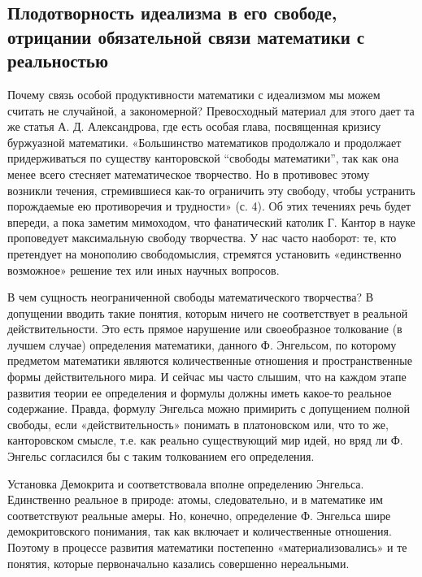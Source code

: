 \subsection{Плодотворность   идеализма   в  его   свободе,   отрицании
обязательной связи математики с реальностью}

Почему связь  особой продуктивности  математики с идеализмом  мы можем
считать  не  случайной,  а  закономерной?  Превосходный  материал  для
этого  дает  та  же  статья   А.  Д.  Александрова,  где  есть  особая
глава,   посвященная  кризису   буржуазной  математики.   «Большинство
математиков  продолжало   и  продолжает  придерживаться   по  существу
канторовской  ``свободы   математики'',  так   как  она   менее  всего
стесняет  математическое творчество.  Но в  противовес этому  возникли
течения, стремившиеся  как-то ограничить эту свободу,  чтобы устранить
порождаемые ею противоречия и трудности» (с. 4). Об этих течениях речь
будет  впереди, а  пока  заметим мимоходом,  что фанатический  католик
Г.  Кантор  в науке  проповедует  максимальную  свободу творчества.  У
нас  часто наоборот:  те, кто  претендует на  монополию свободомыслия,
стремятся  установить «единственно  возможное»  решение  тех или  иных
научных вопросов.

В чем  сущность неограниченной  свободы математического  творчества? В
допущении  вводить такие  понятия, которым  ничего не  соответствует в
реальной действительности. Это есть  прямое нарушение или своеобразное
толкование  (в  лучшем  случае)  определения  математики,  данного  Ф.
Энгельсом,  по которому  предметом математики  являются количественные
отношения и  пространственные формы действительного мира.  И сейчас мы
часто  слышим, что  на  каждом этапе  развития  теории ее  определения
и  формулы   должны  иметь   какое-то  реальное   содержание.  Правда,
формулу  Энгельса   можно  примирить  с  допущением   полной  свободы,
если  «действительность»  понимать  в  платоновском или,  что  то  же,
канторовском смысле, т.е.  как реально существующий мир  идей, но вряд
ли Ф. Энгельс согласился бы с таким толкованием его определения.

Установка  Демокрита и  соответствовала  вполне определению  Энгельса.
Единственно реальное  в природе: атомы, следовательно,  и в математике
им соответствуют реальные амеры.  Но, конечно, определение Ф. Энгельса
шире  демокритовского понимания,  так  как  включает и  количественные
отношения.   Поэтому  в   процессе   развития  математики   постепенно
«материализовались»  и  те  понятия,  которые  первоначально  казались
совершенно нереальными.

